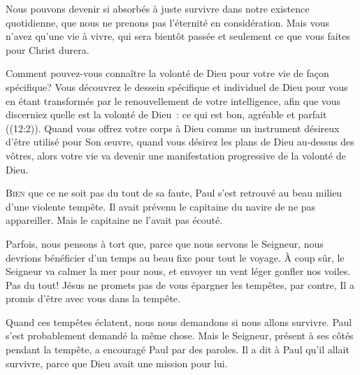 
Nous pouvons devenir si absorbés à juste survivre dans notre existence
 quotidienne, que nous ne prenons pas l'éternité en considération.
 Mais vous n'avez qu'une vie à vivre, qui sera bientôt passée
 et seulement ce que vous faites pour Christ durera.

Comment pouvez-vous connaître la volonté de Dieu pour votre vie
 de façon spécifique? Vous découvrez le dessein spécifique et individuel
 de Dieu pour vous en étant \og transformés par le renouvellement
 de votre intelligence, afin que vous discerniez quelle est la volonté de Dieu~:
 ce qui est bon, agréable et parfait \fg{} ((12:2)).
 Quand vous offrez votre corps à Dieu comme un instrument désireux
 d'être utilisé pour Son \oe{}uvre, quand vous désirez les plans de Dieu
 au-dessus des vôtres, alors votre vie va devenir une manifestation
 progressive de la volonté de Dieu.


\dvrule






\lettrine{B}{ien} que ce ne soit pas du tout de sa faute,
 Paul s'est retrouvé au beau milieu d'une violente tempête.
 Il avait prévenu le capitaine du navire de ne pas appareiller.
 Mais le capitaine ne l'avait pas écouté.

Parfois, nous pensons à tort que, parce que nous servons le Seigneur,
 nous devrions bénéficier d'un temps au beau fixe pour tout le voyage.
 À coup sûr, le Seigneur va calmer la mer pour nous,
 et envoyer un vent léger gonfler nos voiles. Pas du tout!
 Jésus ne promets pas de vous épargner les tempêtes, par contre,
 Il a promis d'être avec vous dans la tempête.


Quand ces tempêtes éclatent, nous nous demandons si nous allons survivre.
 Paul s'est probablement demandé la même chose.
 Mais le Seigneur, présent à ses côtés pendant la tempête,
 a encouragé Paul par des paroles. Il a dit à Paul qu'il allait survivre,
 parce que Dieu avait une mission pour lui.


